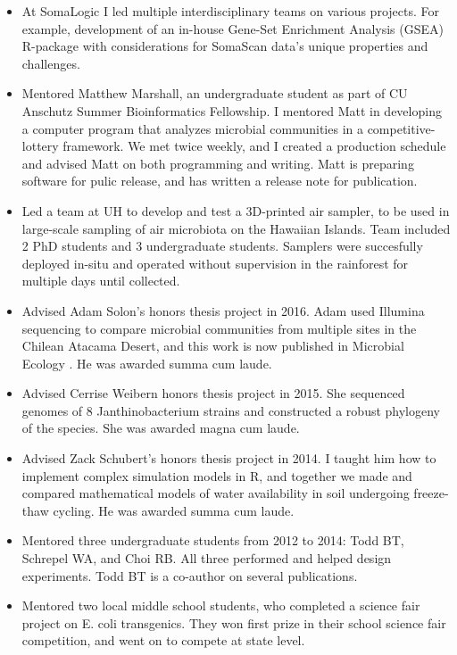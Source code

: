 \documentclass{article}
\begin{document}
\begin{itemize}[noitemsep,topsep=0pt, leftmargin=5mm]
  \item At SomaLogic I led multiple interdisciplinary teams on various projects. For example, development of an in-house Gene-Set Enrichment Analysis (GSEA) R-package with considerations for SomaScan data's unique properties and challenges. 
  \item Mentored Matthew Marshall, an undergraduate student as part of CU Anschutz Summer Bioinformatics Fellowship. I mentored Matt in developing a computer program that analyzes microbial communities in a competitive-lottery framework. We met twice weekly, and I created a production schedule and advised Matt on both programming and writing. Matt is preparing software for pulic release, and has written a release note for publication.
  \item Led a team at UH to develop and test a 3D-printed air sampler, to be used in large-scale sampling of air microbiota on the Hawaiian Islands. Team included 2 PhD students and 3 undergraduate students. Samplers were succesfully deployed in-situ and operated without supervision in the rainforest for multiple days until collected.
  \item Advised Adam Solon's honors thesis project in 2016. Adam used Illumina sequencing to compare microbial communities from multiple sites in the Chilean Atacama Desert, and this work is now published in Microbial Ecology \cite{Solon2018}. He was awarded summa cum laude.
  \item Advised Cerrise Weibern honors thesis project in 2015. She sequenced genomes of 8 Janthinobacterium strains and constructed a robust phylogeny of the species. She was awarded magna cum laude.
  \item Advised Zack Schubert's honors thesis project in 2014. I taught him how to implement complex simulation models in R, and together we made and compared mathematical models of water availability in soil undergoing freeze-thaw cycling. He was awarded summa cum laude.
  \item Mentored three undergraduate students from 2012 to 2014: Todd BT, Schrepel WA, and Choi RB. All three performed and helped design experiments. Todd BT is a co-author on several publications.
  \item Mentored two local middle school students, who completed a science fair project on E. coli transgenics. They won first prize in their school science fair competition, and went on to compete at state level.
\end{itemize}
\end{document}
